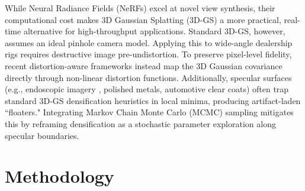 \documentclass[letterpaper, 10 pt, conference]{ieeeconf}  %
\begin{document}
While Neural Radiance Fields (NeRFs) \cite{mildenhall2021nerf} excel at novel view synthesis, their computational cost makes 3D Gaussian Splatting (3D-GS) \cite{kerbl20233d} a more practical, real-time alternative for high-throughput applications. Standard 3D-GS, however, assumes an ideal pinhole camera model. Applying this to wide-angle dealership rigs requires destructive image pre-undistortion. To preserve pixel-level fidelity, recent distortion-aware frameworks \cite{liao2024fisheye} instead map the 3D Gaussian covariance directly through non-linear distortion functions. Additionally, specular surfaces (e.g., endoscopic imagery \cite{li2025gaussian}, polished metals, automotive clear coats) often trap standard 3D-GS densification heuristics in local minima, producing artifact-laden ``floaters." Integrating Markov Chain Monte Carlo (MCMC) sampling \cite{kheradmand20243d} mitigates this by reframing densification as a stochastic parameter exploration along specular boundaries.
















\section{Methodology} 
\label{sec:methodology}
\end{document}
